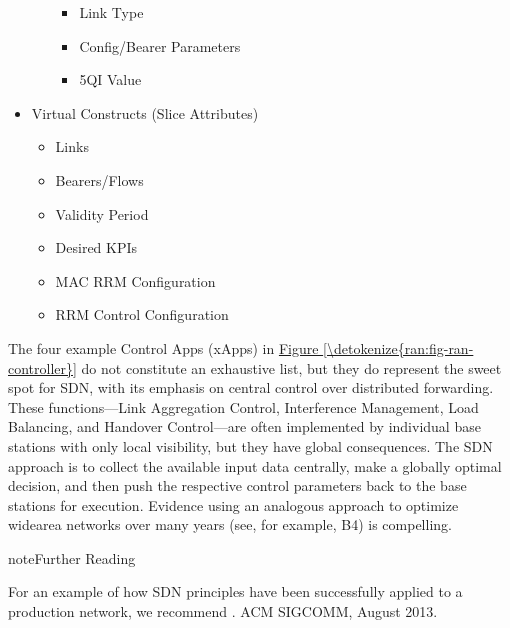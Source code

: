 \documentclass[a4paper,11pt,english]{sphinxmanual}
\begin{document}
\begin{itemize}
\begin{itemize}
\begin{itemize}
\item {} 
\sphinxAtStartPar
Link Type

\item {} 
\sphinxAtStartPar
Config/Bearer Parameters

\item {} 
\sphinxAtStartPar
5QI Value

\end{itemize}

\end{itemize}

\item {} 
\sphinxAtStartPar
Virtual Constructs (Slice Attributes)
\begin{itemize}
\item {} 
\sphinxAtStartPar
Links

\item {} 
\sphinxAtStartPar
Bearers/Flows

\item {} 
\sphinxAtStartPar
Validity Period

\item {} 
\sphinxAtStartPar
Desired KPIs

\item {} 
\sphinxAtStartPar
MAC RRM Configuration

\item {} 
\sphinxAtStartPar
RRM Control Configuration

\end{itemize}

\end{itemize}

\sphinxAtStartPar
The four example Control Apps (xApps) in \hyperref[\detokenize{ran:fig-ran-controller}]{Figure \ref{\detokenize{ran:fig-ran-controller}}} do not constitute an exhaustive list, but they
do represent the sweet spot for SDN, with its emphasis on central
control over distributed forwarding. These functions—Link Aggregation
Control, Interference Management, Load Balancing, and Handover
Control—are often implemented by individual base stations with only
local visibility, but they have global consequences. The SDN approach
is to collect the available input data centrally, make a globally
optimal decision, and then push the respective control parameters back
to the base stations for execution. Evidence using an analogous
approach to optimize wide\sphinxhyphen{}area networks over many years (see, for
example, B4) is compelling.

\label{\detokenize{ran:reading-b4}}
\begin{sphinxadmonition}{note}{Further Reading}

\sphinxAtStartPar
For an example of how SDN principles have been successfully applied
to a production network, we recommend .  ACM
SIGCOMM, August 2013.
\end{sphinxadmonition}
\end{document}
